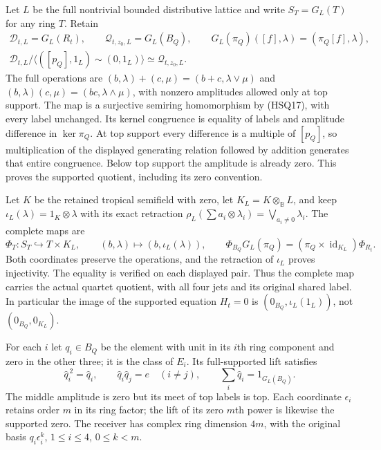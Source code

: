 Let $L$ be the full nontrivial bounded distributive lattice and
write $S_T=G_L(T)$ for any ring $T$. Retain
\begin{equation}\tag{HSQ18}
 \begin{gathered}
 \mathscr D_{t,L}=G_L(R_t),\qquad
 \mathscr Q_{t,z_0,L}=G_L(B_Q),\qquad
 G_L(\pi_Q)([f],\lambda)=(\pi_Q[f],\lambda),\\
 \mathscr D_{t,L}/\langle([p_Q],1_L)\sim(0,1_L)\rangle
                \simeq\mathscr Q_{t,z_0,L}.
 \end{gathered}
\end{equation}
The full operations are
$(b,\lambda)+(c,\mu)=(b+c,\lambda\vee\mu)$ and
$(b,\lambda)(c,\mu)=(bc,\lambda\wedge\mu)$, with nonzero
amplitudes allowed only at top support. The map is a surjective
semiring homomorphism by (HSQ17), with every label unchanged.
Its kernel congruence is equality of labels and amplitude
difference in $\ker\pi_Q$. At top support every difference
is a multiple of $[p_Q]$, so multiplication of the displayed
generating relation followed by addition generates that entire
congruence. Below top support the amplitude is already zero.
This proves the supported quotient, including its zero convention.

Let $K$ be the retained tropical semifield with zero, let
$K_L=K\otimes_{\mathbb B}L$, and keep
$\iota_L(\lambda)=1_K\otimes\lambda$ with its exact retraction
$\rho_L(\sum a_i\otimes\lambda_i)=\bigvee_{a_i\ne0}\lambda_i$.
The complete maps are
\begin{equation}\tag{HSQ19}
 \Phi_T:S_T\hookrightarrow T\times K_L,
 \qquad(b,\lambda)\longmapsto(b,\iota_L(\lambda)),\qquad
 \Phi_{B_Q}G_L(\pi_Q)
       =(\pi_Q\times\operatorname{id}_{K_L})\Phi_{R_t}.
\end{equation}
Both coordinates preserve the operations, and the retraction
of $\iota_L$ proves injectivity. The equality is verified on
each displayed pair. Thus the complete map carries the actual
quartet quotient, with all four jets and its original shared label.
In particular the image of the supported equation $H_t=0$ is
$(0_{B_Q},\iota_L(1_L))$, not $(0_{B_Q},0_{K_L})$.

For each $i$ let $q_i\in B_Q$ be the element with unit in its
$i$th ring component and zero in the other three; it is the class
of $E_i$. Its full-supported lift satisfies
\begin{equation}\tag{HSQ20}
 \widehat q_i^{\,2}=\widehat q_i,\qquad
 \widehat q_i\widehat q_j=e\quad(i\ne j),\qquad
 \sum_i\widehat q_i=1_{G_L(B_Q)}.
\end{equation}
The middle amplitude is zero but its meet of top labels is top.
Each coordinate $\epsilon_i$ retains order $m$ in its ring factor;
the lift of its zero $m$th power is likewise the supported zero.
The receiver has complex ring dimension $4m$, with the original
basis $q_i\epsilon_i^k$, $1\le i\le4$, $0\le k<m$.

